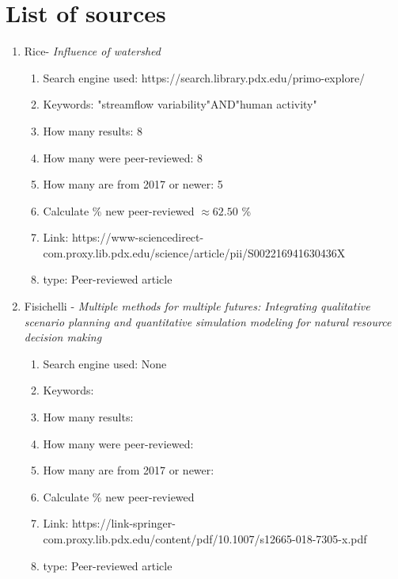 \documentclass{article}
\begin{document}
\section{List of sources}

\begin{enumerate}

    \item Rice-\textit{ Influence of watershed}
        \begin{enumerate}
            \item Search engine used: https://search.library.pdx.edu/primo-explore/
            \item Keywords: "streamflow variability"AND"human activity"
            \item How many results: 8 
            \item How many were peer-reviewed: 8
            \item How many are from 2017 or newer: 5
            \item Calculate \% new peer-reviewed $\approx 62.50$  \%
            \item Link: https://www-sciencedirect-com.proxy.lib.pdx.edu/science/article/pii/S002216941630436X
            \item type: Peer-reviewed article
        \end{enumerate}

    \item Fisichelli - \textit{Multiple methods for multiple futures: Integrating qualitative scenario planning and quantitative simulation modeling for natural resource decision making}
        \begin{enumerate}
            \item Search engine used: None 
            \item Keywords: 
            \item How many results:  
            \item How many were peer-reviewed: 
            \item How many are from 2017 or newer: 
            \item Calculate \% new peer-reviewed 
            \item Link: https://link-springer-com.proxy.lib.pdx.edu/content/pdf/10.1007/s12665-018-7305-x.pdf
            \item type: Peer-reviewed article
        \end{enumerate}


\end{enumerate}
\end{document}
